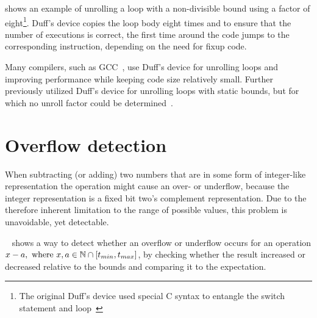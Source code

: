  shows an example of unrolling a loop with a non-divisible bound using a factor of eight\footnote{The original Duff's device used special C syntax to entangle the switch statement and loop~\cite{duff_1983}}.
Duff's device copies the loop body eight times and to ensure that the number of executions is correct, the first time around the code jumps to the corresponding instruction, depending on the need for fixup code.

Many compilers, such as GCC~\cite{gcc}, use Duff's device for unrolling loops and improving performance while keeping code size relatively small.
Further \libFIRM{} previously utilized Duff's device for unrolling loops with static bounds, but for which no unroll factor could be determined~\cite{helmer10studienarbeit}.



\section{Overflow detection}\label{sec:basics:overflow}

When subtracting (or adding) two numbers that are in some form of integer-like representation the operation might cause an over- or underflow, because the integer representation is a fixed bit two's complement representation.
Due to the therefore inherent limitation to the range of possible values, this problem is unavoidable, yet detectable.

~\cite{pmg_2009} shows a way to detect whether an overflow or underflow occurs for an operation $x - a, \text{ where } x, a \in \mathbb{N} \cap {\lbrack t_{min}, t_{max} \rbrack}$, by checking whether the result increased or decreased relative to the bounds and comparing it to the expectation.


